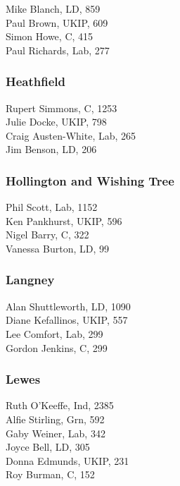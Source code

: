 \documentclass[a4paper,openany,10pt]{book}
\begin{document}
Mike Blanch, LD, 859\\
Paul Brown, UKIP, 609\\
Simon Howe, C, 415\\
Paul Richards, Lab, 277\\


\subsubsection*{Heathfield}



Rupert Simmons, C, 1253\\
Julie Docke, UKIP, 798\\
Craig Austen-White, Lab, 265\\
Jim Benson, LD, 206\\


\subsubsection*{Hollington and Wishing Tree}



Phil Scott, Lab, 1152\\
Ken Pankhurst, UKIP, 596\\
Nigel Barry, C, 322\\
Vanessa Burton, LD, 99\\


\subsubsection*{Langney}



Alan Shuttleworth, LD, 1090\\
Diane Kefallinos, UKIP, 557\\
Lee Comfort, Lab, 299\\
Gordon Jenkins, C, 299\\


\subsubsection*{Lewes}



Ruth O'Keeffe, Ind, 2385\\
Alfie Stirling, Grn, 592\\
Gaby Weiner, Lab, 342\\
Joyce Bell, LD, 305\\
Donna Edmunds, UKIP, 231\\
Roy Burman, C, 152\\
\end{document}

